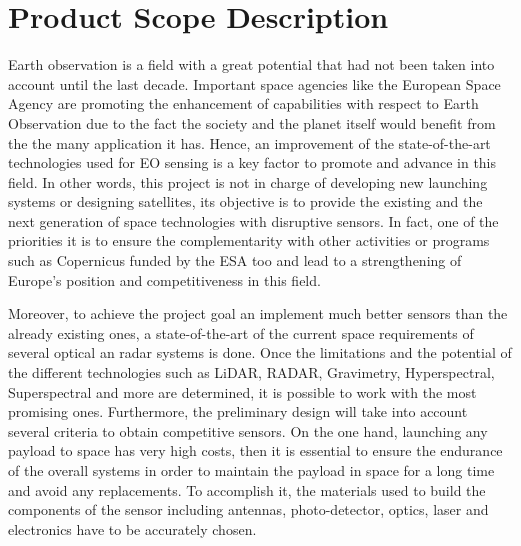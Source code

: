 \section{Product Scope Description}

Earth observation is a field with a great potential that had not been taken into account until the last decade. Important space agencies like the European Space Agency are promoting the enhancement of capabilities with respect to Earth Observation due to the fact the society and the planet itself would benefit from the the many application it has. Hence, an improvement of the state-of-the-art technologies used for EO sensing is a key factor to promote and advance in this field. In other words, this project is not in charge of developing new launching systems or designing satellites, its objective is to provide the existing and the next generation of space technologies with disruptive sensors. In fact, one of the priorities it is to ensure the complementarity with other activities or programs such as Copernicus funded by the ESA too and lead to a strengthening of Europe's position and competitiveness in this field.

Moreover, to achieve the project goal an implement much better sensors than the already existing ones, a state-of-the-art of the current space requirements of several optical an radar systems is done. Once the limitations and the potential of the different technologies such as LiDAR, RADAR, Gravimetry, Hyperspectral, Superspectral and more are determined, it is possible to work with the most promising ones. Furthermore, the preliminary design will take into account several criteria to obtain competitive sensors. On the one hand, launching any payload to space has very high costs, then it is essential to ensure the endurance of the overall systems in order to maintain the payload in space for a long time and avoid any replacements. To accomplish it, the materials used to build the components of the sensor including antennas, photo-detector, optics, laser and electronics have to be accurately chosen.

